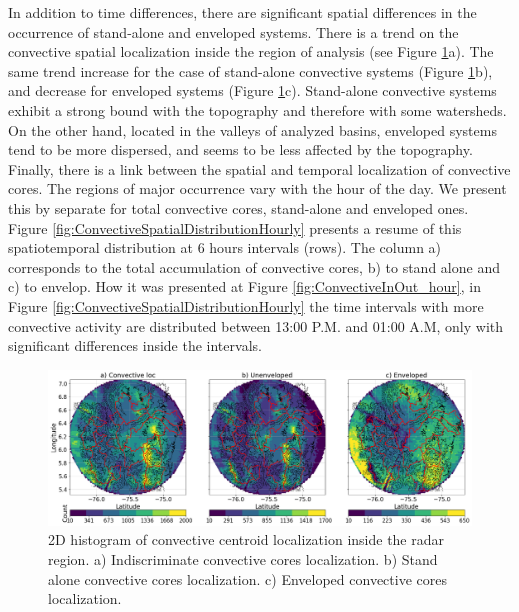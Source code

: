 \documentclass[preprint,12pt]{elsarticle}
\begin{document}
In addition to time differences, there are significant spatial differences in the occurrence of stand-alone and enveloped systems.  There is a trend on the convective spatial localization inside the region of analysis (see Figure \ref{fig:ConvectiveSpatialDistribution}a). The same trend increase for the case of stand-alone convective systems (Figure \ref{fig:ConvectiveSpatialDistribution}b), and decrease for enveloped systems (Figure \ref{fig:ConvectiveSpatialDistribution}c).  Stand-alone convective systems exhibit a strong bound with the topography and therefore with some watersheds.  On the other hand, located in the valleys of analyzed basins, enveloped systems tend to be more dispersed, and seems to be less affected by the topography.\\   

Finally, there is a link between the spatial and temporal localization of convective cores.  The regions of major occurrence vary with the hour of the day. We present this by separate for total convective cores, stand-alone and enveloped ones.  Figure \ref{fig:ConvectiveSpatialDistributionHourly} presents a resume of this spatiotemporal distribution at 6 hours intervals (rows). The column a) corresponds to the total accumulation of convective cores, b) to stand alone and c) to envelop.  How it was presented at Figure \ref{fig:ConvectiveInOut_hour}, in Figure \ref{fig:ConvectiveSpatialDistributionHourly} the time intervals with more convective activity are distributed between 13:00 P.M. and 01:00 A.M, only with significant differences inside the intervals.\\

\begin{figure}[!h]
\centering
  \includegraphics[width=17cm]{Figuras/Localization_conv_evolVsNotEvol.png}
  \caption{2D histogram of convective centroid localization inside the radar region. a) Indiscriminate convective cores localization. b) Stand alone convective cores localization. c) Enveloped convective cores localization.}
  \label{fig:ConvectiveSpatialDistribution}
\end{figure}
\end{document}
